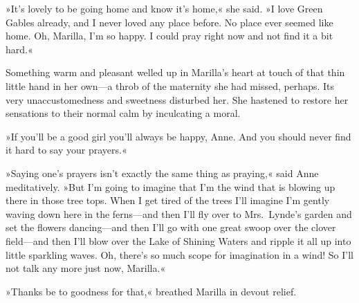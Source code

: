 »It's lovely to be going home and know it's home,« she said. »I love Green Gables already, and I never loved any place before. No place ever seemed like home. Oh, Marilla, I'm so happy. I could pray right now and not find it a bit hard.«

Something warm and pleasant welled up in Marilla's heart at touch of that thin little hand in her own—a throb of the maternity she had missed, perhaps. Its very unaccustomedness and sweetness disturbed her. She hastened to restore her sensations to their normal calm by inculcating a moral.

»If you'll be a good girl you'll always be happy, Anne. And you should never find it hard to say your prayers.«

»Saying one's prayers isn't exactly the same thing as praying,« said Anne meditatively. »But I'm going to imagine that I'm the wind that is blowing up there in those tree tops. When I get tired of the trees I'll imagine I'm gently waving down here in the ferns—and then I'll fly over to Mrs.~Lynde's garden and set the flowers dancing—and then I'll go with one great swoop over the clover field—and then I'll blow over the Lake of Shining Waters and ripple it all up into little sparkling waves. Oh, there's so much scope for imagination in a wind! So I'll not talk any more just now, Marilla.«

»Thanks be to goodness for that,« breathed Marilla in devout relief.

